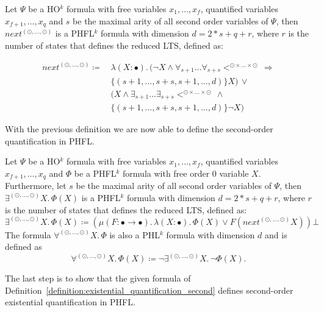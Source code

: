 \begin{definition}
    \label{definition:lower_bounds_next_second}
    Let $\Psi$ be a HO$^k$ formula with free variables $x_1, \dots, x_f$, quantified variables $x_{f+1}, \dots,
    x_q$ and $s$ be the maximal arity of all second order variables of $\Psi$, then $next^{(\odot, \dots, \odot)}$
    is a PHFL$^k$ formula with dimension $d = 2 * s + q + r$, where  $r$ is the number of states that defines the reduced LTS, defined as:

    \begin{align*}
        next^{(\odot, \dots, \odot)} \coloneqq &\,\lambda (X \colon \bullet).\, (\neg X \wedge \forall_{s +
        1}\dots\forall_{s + s}<^{\odot \times \dots \times \odot}\, \Rightarrow \\&\,\{(s +
        1, \dots, s + s, s + 1, \dots, d)\} X) \,\vee \\&\,(X \wedge \exists_{s + 1}\dots\exists_{s + s} <^{\odot
        \times \dots \times \odot} \,\wedge \\&\,\{(s + 1, \dots, s + s, s + 1, \dots, d)\}
        \neg X)
    \end{align*}
\end{definition}

With the previous definition we are now able to define the second-order quantification in PHFL.

\begin{definition}
    \label{definition:existential_quantification_second}
    Let $\Psi$ be a HO$^k$ formula with free variables $x_1, \dots, x_f$, quantified variables $x_{f+1}, \dots,
    x_q$ and $\Phi$ be a PHFL$^k$ formula with free order $0$ variable $X$. Furthermore, let $s$ be the maximal arity
    of all second order variables of $\Psi$, then $\exists^{(\odot, \dots, \odot)}X .\,\Phi(X)$
    is a PHFL$^k$ formula with dimension $d = 2 * s + q + r$, where $r$ is the number of states that defines the reduced LTS, defined as:
    \[\exists^{(\odot, \dots, \odot)}X.\, \Phi(X) \coloneqq (\mu (F \colon \bullet \rightarrow \bullet).\, \lambda (X
    \colon \bullet).\, \Phi(X) \vee F(next^{(\odot, \dots, \odot)} X)) \bot
    \]
    The formula $\forall^{(\odot, \dots, \odot)}X.\,\Phi$ is also a PHL$^k$ formula with dimension $d$ and is defined as
    \[\forall^{(\odot, \dots, \odot)}X.\,\Phi(X) \coloneqq \neg \exists^{(\odot, \dots, \odot)}X .\,\neg\Phi(X).\]
\end{definition}

The last step is to show that the given formula of Definition~\ref{definition:existential_quantification_second} defines
second-order existential quantification in PHFL.

